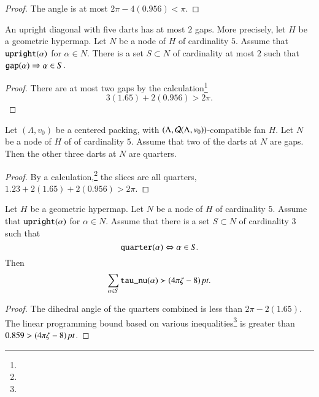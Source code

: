 \begin{proof}  The angle is at most $2\pi - 4(0.956) < \pi$.
\end{proof}

\begin{lemma}  An upright diagonal with
five darts has at most $2$ gaps.  More precisely, let $H$ be a geometric
hypermap.  Let $N$ 
be a node of $H$ of cardinality $5$.   Assume that ${\operatorname{{\texttt{upright}}}}(\alpha)$
for $\alpha\in N$.  There is a set $S\subset N$ of cardinality at most
$2$ such that ${\operatorname{{\texttt{gap}}}}(\alpha) \Rightarrow \alpha\in S$.
\end{lemma}

\begin{proof}
There are at most
two gaps by the calculation\footnote{} %
    $$3(1.65)+2(0.956)>2\pi.$$
\end{proof}

\begin{lemma}\label{a:5dart:3q}
Let $(\Lambda,v_0)$ be a centered packing, 
with $(\Lambda,{\mathcal Q}(\Lambda,v_0))$-compatible fan $H$.
Let $N$ be a node of $H$ of  of cardinality $5$.  Assume that
two of the darts at $N$ are gaps.  Then the other three darts
at $N$ are quarters.
\end{lemma}

\begin{proof}
By a calculation,\footnote{} %
the slices are all quarters,
    $1.23+2(1.65)+2(0.956)>2\pi$.
\end{proof}

\begin{lemma}  Let $H$ be a geometric
hypermap.  Let $N$ be a node of $H$ of cardinality $5$.  Assume
that ${\operatorname{{\texttt{upright}}}}(\alpha)$ for $\alpha\in N$.  Assume that there
is a set $S\subset N$ of cardinality $3$ such that
  $${\operatorname{{\texttt{quarter}}}}(\alpha)\Leftrightarrow \alpha\in S.$$
Then 
  $$
  \sum_{\alpha\in S} {\operatorname{{\texttt{tau\_nu}}}}(\alpha) \succ (4\pi\zeta-8)\,\hbox{\it pt}.
  $$
\end{lemma}

\begin{proof}
The dihedral angle of the quarters combined is less than $2\pi-2(1.65)$.  
The linear programming
bound based on various inequalities\footnote{} %
is greater than $0.859>(4\pi\zeta-8)\,\hbox{\it pt}$.
\end{proof}



